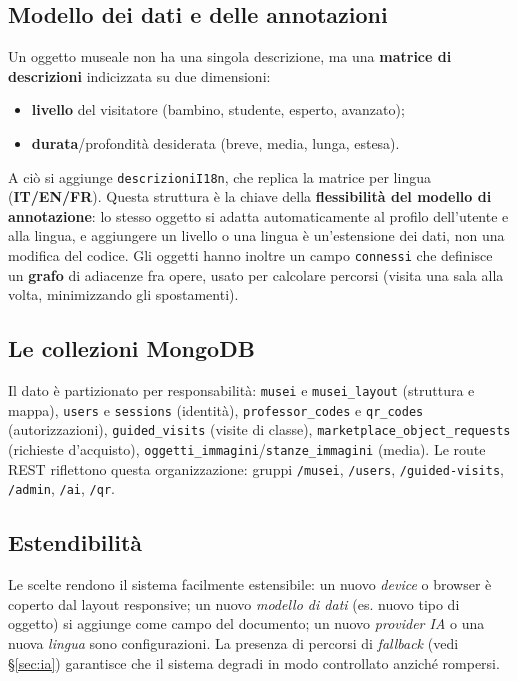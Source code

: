 \documentclass[11pt,a4paper]{article}
\newcommand{\code}[1]{\texttt{#1}}
\begin{document}
\subsection{Modello dei dati e delle annotazioni}
Un oggetto museale non ha una singola descrizione, ma una \textbf{matrice di
descrizioni} indicizzata su due dimensioni:
\begin{itemize}[leftmargin=1.3em,nosep]
  \item \textbf{livello} del visitatore (bambino, studente, esperto, avanzato);
  \item \textbf{durata}/profondità desiderata (breve, media, lunga, estesa).
\end{itemize}
A ciò si aggiunge \code{descrizioniI18n}, che replica la matrice per lingua
(\textbf{IT/EN/FR}). Questa struttura è la chiave della \textbf{flessibilità del
modello di annotazione}: lo stesso oggetto si adatta automaticamente al profilo
dell'utente e alla lingua, e aggiungere un livello o una lingua è un'estensione
dei dati, non una modifica del codice. Gli oggetti hanno inoltre un campo
\code{connessi} che definisce un \textbf{grafo} di adiacenze fra opere, usato per
calcolare percorsi (visita una sala alla volta, minimizzando gli spostamenti).

\subsection{Le collezioni MongoDB}
Il dato è partizionato per responsabilità: \code{musei} e \code{musei\_layout}
(struttura e mappa), \code{users} e \code{sessions} (identità), \code{professor\_codes}
e \code{qr\_codes} (autorizzazioni), \code{guided\_visits} (visite di classe),
\code{marketplace\_object\_requests} (richieste d'acquisto),
\code{oggetti\_immagini}/\code{stanze\_immagini} (media). Le route REST riflettono
questa organizzazione: gruppi \code{/musei}, \code{/users}, \code{/guided-visits},
\code{/admin}, \code{/ai}, \code{/qr}.

\subsection{Estendibilità}
Le scelte rendono il sistema facilmente estensibile: un nuovo \emph{device} o
browser è coperto dal layout responsive; un nuovo \emph{modello di dati} (es.
nuovo tipo di oggetto) si aggiunge come campo del documento; un nuovo
\emph{provider IA} o una nuova \emph{lingua} sono configurazioni. La presenza di
percorsi di \emph{fallback} (vedi §\ref{sec:ia}) garantisce che il sistema
degradi in modo controllato anziché rompersi.
\end{document}
